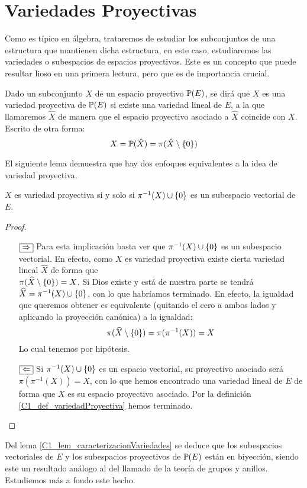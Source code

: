 \section{Variedades Proyectivas}
\label{C1_variedadesProyectivas}
Como es típico en álgebra, trataremos de estudiar los subconjuntos de una estructura que mantienen dicha estructura, en este caso, estudiaremos las variedades o subespacios de espacios proyectivos. Este es un concepto que puede resultar lioso en una primera lectura, pero que es de importancia crucial.
\begin{defi}
	\label{C1_def_variedadProyectiva}
	Dado un subconjunto $X$ de un espacio proyectivo $\mathbb{P}(E)$, se dirá que $X$ es una variedad proyectiva de $\mathbb{P}(E)$ si existe una variedad lineal de $E$, a la que llamaremos $\hat{X}$ de manera que el espacio proyectivo asociado a $\hat{X}$ coincide con $X$. Escrito de otra forma:
	\[
		X=\mathbb{P}(\hat{X})=\pi(\hat{X}\setminus\{0\})
	\]
\end{defi}

El siguiente lema demuestra que hay dos enfoques equivalentes a la idea de variedad proyectiva.
\begin{lem}
	\label{C1_lem_caracterizacionVariedades}
	$X$ es variedad proyectiva si y solo si $\pi^{-1}(X)\cup\{0\}$ es un subespacio vectorial de $E$.
\end{lem}
\begin{proof}
\begin{itemize}
	\item[$\fbox{$\Rightarrow$}$] Para esta implicación basta ver que $\pi^{-1}(X)\cup\{0\}$ es un subespacio vectorial. En efecto, como $X$ es variedad proyectiva existe cierta variedad lineal $\widehat{X}$ de forma que \\$\pi(\widehat{X}\setminus\{0\})=X$. Si Dios existe y está de nuestra parte se tendrá  $\widehat{X}=\pi^{-1}(X)\cup\{0\}$, con lo que habríamos terminado. En efecto, la igualdad que queremos obtener es equivalente (quitando el cero a ambos lados y aplicando la proyección canónica) a la igualdad: \[\pi(\widehat{X}\setminus\{0\})=\pi(\pi^{-1}(X))=X\]Lo cual tenemos por hipótesis.
	\item[$\fbox{$\Leftarrow$}$] Si $\pi^{-1}(X)\cup\{0\}$ es un espacio vectorial, su proyectivo asociado será $\pi(\pi^{-1}(X))=X$, con lo que hemos encontrado una variedad lineal de $E$ de forma que $X$ es su espacio proyectivo asociado. Por la definición \ref{C1_def_variedadProyectiva} hemos terminado.
\end{itemize}
\end{proof}
Del lema \ref{C1_lem_caracterizacionVariedades} se deduce que los subespacios vectoriales de $E$ y los subespacios proyectivos de $\mathbb{P}(E)$ están en biyección, siendo este un resultado análogo al del llamado  de la teoría de grupos y anillos. Estudiemos más a fondo este hecho.

